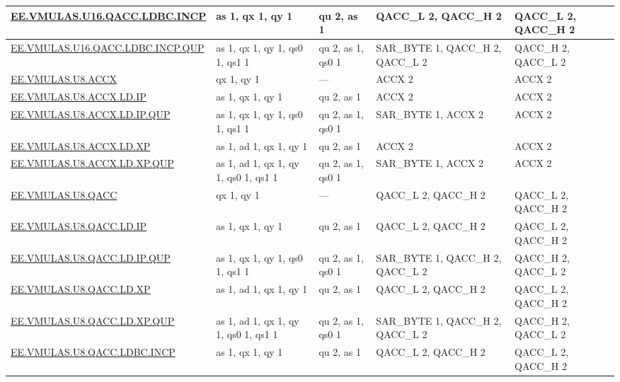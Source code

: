 \begin{longtable}[c]{|l|m{2.5cm}|m{2.5cm}|m{2.5cm}|m{2.5cm}|}
    \hyperref[instruction:EEVMULASU16QACCLDBCINCP]{EE.VMULAS.U16.QACC.LDBC.INCP} & as 1, qx 1, qy 1 & qu 2, as 1 & QACC\_L 2, QACC\_H 2 & QACC\_L 2, QACC\_H 2\\\hline
    \hyperref[instruction:EEVMULASU16QACCLDBCINCPQUP]{EE.VMULAS.U16.QACC.LDBC.INCP.QUP} & as 1, qx 1, qy 1, qs0 1, qs1 1 & qu 2, as 1, qs0 1 & SAR\_BYTE 1, QACC\_H 2, QACC\_L 2 & QACC\_H 2, QACC\_L 2\\\hline
    \hyperref[instruction:EEVMULASU8ACCX]{EE.VMULAS.U8.ACCX} & qx 1, qy 1 & — & ACCX 2 & ACCX 2\\\hline
    \hyperref[instruction:EEVMULASU8ACCXLDIP]{EE.VMULAS.U8.ACCX.LD.IP} & as 1, qx 1, qy 1 & qu 2, as 1 & ACCX 2 & ACCX 2\\\hline
    \hyperref[instruction:EEVMULASU8ACCXLDIPQUP]{EE.VMULAS.U8.ACCX.LD.IP.QUP} & as 1, qx 1, qy 1, qs0 1, qs1 1 & qu 2, as 1, qs0 1 & SAR\_BYTE 1, ACCX 2 & ACCX 2\\\hline
    \hyperref[instruction:EEVMULASU8ACCXLDXP]{EE.VMULAS.U8.ACCX.LD.XP} & as 1, ad 1, qx 1, qy 1 & qu 2, as 1 & ACCX 2 & ACCX 2\\\hline
    \hyperref[instruction:EEVMULASU8ACCXLDXPQUP]{EE.VMULAS.U8.ACCX.LD.XP.QUP} & as 1, ad 1, qx 1, qy 1, qs0 1, qs1 1 & qu 2, as 1, qs0 1 & SAR\_BYTE 1, ACCX 2 & ACCX 2\\\hline
    \hyperref[instruction:EEVMULASU8QACC]{EE.VMULAS.U8.QACC} & qx 1, qy 1 & — & QACC\_L 2, QACC\_H 2 & QACC\_L 2, QACC\_H 2\\\hline
    \hyperref[instruction:EEVMULASU8QACCLDIP]{EE.VMULAS.U8.QACC.LD.IP} & as 1, qx 1, qy 1 & qu 2, as 1 & QACC\_L 2, QACC\_H 2 & QACC\_L 2, QACC\_H 2\\\hline
    \hyperref[instruction:EEVMULASU8QACCLDIPQUP]{EE.VMULAS.U8.QACC.LD.IP.QUP} & as 1, qx 1, qy 1, qs0 1, qs1 1 & qu 2, as 1, qs0 1 & SAR\_BYTE 1, QACC\_H 2, QACC\_L 2 & QACC\_H 2, QACC\_L 2\\\hline
    \hyperref[instruction:EEVMULASU8QACCLDXP]{EE.VMULAS.U8.QACC.LD.XP} & as 1, ad 1, qx 1, qy 1 & qu 2, as 1 & QACC\_L 2, QACC\_H 2 & QACC\_L 2, QACC\_H 2\\\hline
    \hyperref[instruction:EEVMULASU8QACCLDXPQUP]{EE.VMULAS.U8.QACC.LD.XP.QUP} & as 1, ad 1, qx 1, qy 1, qs0 1, qs1 1 & qu 2, as 1, qs0 1 & SAR\_BYTE 1, QACC\_H 2, QACC\_L 2 & QACC\_H 2, QACC\_L 2\\\hline
    \hyperref[instruction:EEVMULASU8QACCLDBCINCP]{EE.VMULAS.U8.QACC.LDBC.INCP} & as 1, qx 1, qy 1 & qu 2, as 1 & QACC\_L 2, QACC\_H 2 & QACC\_L 2, QACC\_H 2\\\hline

\end{longtable}
